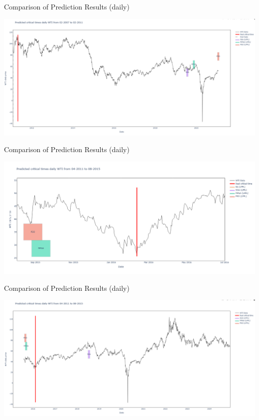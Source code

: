 \documentclass{beamer}
\begin{document}
\begin{frame}{Comparison of Prediction Results (daily)}
    \begin{center}
        \includegraphics[width=\textwidth]{plot_overlead/daily_WTI_2_all_price.png}
    \end{center}
\end{frame}

\begin{frame}{Comparison of Prediction Results (daily)}
    \begin{center}
        \includegraphics[width=\textwidth]{plot_overlead/daily_WTI_3.png}
    \end{center}
\end{frame}

\begin{frame}{Comparison of Prediction Results (daily)}
    \begin{center}
        \includegraphics[width=\textwidth]{plot_overlead/daily_WTI_3_all_price.png}
    \end{center}
\end{frame}
\end{document}
